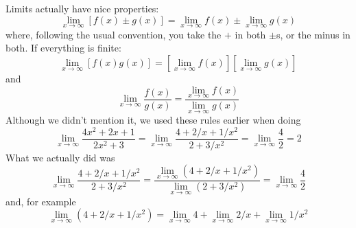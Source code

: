 \documentclass[11pt,a4paper]{scrartcl}
\begin{document}
Limits actually have nice properties:
\begin{equation}
\lim_{x\rightarrow \infty}[f(x)\pm g(x)]=\lim_{x\rightarrow \infty}f(x)\pm \lim_{x\rightarrow \infty}g(x)
\end{equation}
where, following the usual convention, you take the $+$ in both
$\pm$s, or the minus in both. If everything is finite:
\begin{equation}
\lim_{x\rightarrow \infty}[f(x)g(x)]=\left[\lim_{x\rightarrow \infty}f(x)\right]\left[\lim_{x\rightarrow \infty}g(x)\right]
\end{equation}
and
\begin{equation}
\lim_{x\rightarrow \infty}\frac{f(x)}{g(x)}=\frac{\lim_{x\rightarrow \infty}f(x)}{\lim_{x\rightarrow \infty}g(x)}
\end{equation}
Although we didn't mention it, we used these rules earlier when doing
\begin{equation}
\lim_{x\rightarrow \infty}\frac{4x^2+2x+1}{2x^2+3}=
\lim_{x\rightarrow \infty}\frac{4+2/x+1/x^2}{2+3/x^2}=
\lim_{x\rightarrow \infty}\frac{4}{2}=2
\end{equation}
What we actually did was 
\begin{equation}
\lim_{x\rightarrow \infty}\frac{4+2/x+1/x^2}{2+3/x^2}=
\frac{\lim_{x\rightarrow \infty}(4+2/x+1/x^2)}{\lim_{x\rightarrow \infty}(2+3/x^2)}=
\lim_{x\rightarrow \infty}\frac{4}{2}
\end{equation}
and, for example
\begin{equation}
\lim_{x\rightarrow \infty} (4+2/x+1/x^2)=\lim_{x\rightarrow \infty} 4+\lim_{x\rightarrow \infty}2/x+\lim_{x\rightarrow \infty}1/x^2
\end{equation}
\end{document}
